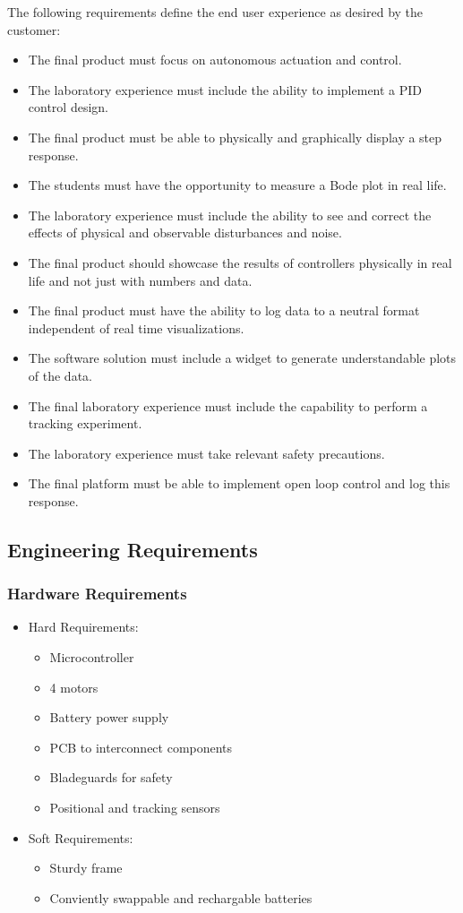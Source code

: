 \documentclass[12pt, titlepage]{article}
\begin{document}
The following requirements define the end user experience as desired by the customer:
  \begin{itemize}
    \item The final product must focus on autonomous actuation and control.
    \item The laboratory experience must include the ability to implement a PID control design.
    \item The final product must be able to physically and graphically display a step response.
    \item The students must have the opportunity to measure a Bode plot in real life.
    \item The laboratory experience must include the ability to see and correct the effects of physical and observable disturbances and noise.
    \item The final product should showcase the results of controllers physically in real life and not just with numbers and data.
    \item The final product must have the ability to log data to a neutral format independent of real time visualizations.
    \item The software solution must include a widget to generate understandable plots of the data.
    \item The final laboratory experience must include the capability to perform a tracking experiment.
    \item The laboratory experience must take relevant safety precautions.
    \item The final platform must be able to implement open loop control and log this response. 
  \end{itemize}
\subsection{Engineering Requirements}
\subsubsection{Hardware Requirements}
\begin{itemize}
  \item[$\Rightarrow$] Hard Requirements:
  \begin{itemize}
    \item Microcontroller
    \item 4 motors
    \item Battery power supply
    \item PCB to interconnect components
    \item Bladeguards for safety
    \item Positional and tracking sensors
  \end{itemize}
  \item[$\Rightarrow$] Soft Requirements:
  \begin{itemize}
    \item Sturdy frame
    \item Conviently swappable and rechargable batteries
  \end{itemize}
\end{itemize}
\end{document}
